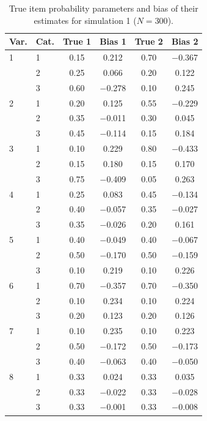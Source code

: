 \begin{table}[H]
\centering
\begin{tabular}{llcccc}
  \toprule
\textbf{Var.} & \textbf{Cat.} & \textbf{True 1} & \textbf{Bias 1} & \textbf{True 2} & \textbf{Bias 2} \\ 
  \midrule
1 & 1 & 0.15 & 0.212 & 0.70 & $-$0.367 \\ 
   & 2 & 0.25 & 0.066 & 0.20 & 0.122 \\ 
   & 3 & 0.60 & $-$0.278 & 0.10 & 0.245 \\ 
  2 & 1 & 0.20 & 0.125 & 0.55 & $-$0.229 \\ 
   & 2 & 0.35 & $-$0.011 & 0.30 & 0.045 \\ 
   & 3 & 0.45 & $-$0.114 & 0.15 & 0.184 \\ 
  3 & 1 & 0.10 & 0.229 & 0.80 & $-$0.433 \\ 
   & 2 & 0.15 & 0.180 & 0.15 & 0.170 \\ 
   & 3 & 0.75 & $-$0.409 & 0.05 & 0.263 \\ 
  4 & 1 & 0.25 & 0.083 & 0.45 & $-$0.134 \\ 
   & 2 & 0.40 & $-$0.057 & 0.35 & $-$0.027 \\ 
   & 3 & 0.35 & $-$0.026 & 0.20 & 0.161 \\ 
  5 & 1 & 0.40 & $-$0.049 & 0.40 & $-$0.067 \\ 
   & 2 & 0.50 & $-$0.170 & 0.50 & $-$0.159 \\ 
   & 3 & 0.10 & 0.219 & 0.10 & 0.226 \\ 
  6 & 1 & 0.70 & $-$0.357 & 0.70 & $-$0.350 \\ 
   & 2 & 0.10 & 0.234 & 0.10 & 0.224 \\ 
   & 3 & 0.20 & 0.123 & 0.20 & 0.126 \\ 
  7 & 1 & 0.10 & 0.235 & 0.10 & 0.223 \\ 
   & 2 & 0.50 & $-$0.172 & 0.50 & $-$0.173 \\ 
   & 3 & 0.40 & $-$0.063 & 0.40 & $-$0.050 \\ 
  8 & 1 & 0.33 & 0.024 & 0.33 & 0.035 \\ 
   & 2 & 0.33 & $-$0.022 & 0.33 & $-$0.028 \\ 
   & 3 & 0.33 & $-$0.001 & 0.33 & $-$0.008 \\ 
   \bottomrule
\end{tabular}
\caption{True item probability parameters and bias of their estimates for simulation 1 ($N = 300$).} 
\label{table:sim1_item_prob_bias_N300}
\end{table}
